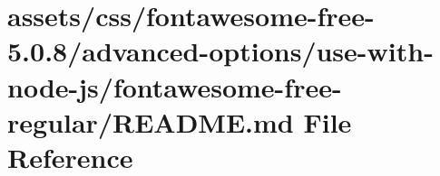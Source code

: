 \hypertarget{css_2fontawesome-free-5_80_88_2advanced-options_2use-with-node-js_2fontawesome-free-regular_2_r_e_a_d_m_e_8md}{}\section{assets/css/fontawesome-\/free-\/5.0.8/advanced-\/options/use-\/with-\/node-\/js/fontawesome-\/free-\/regular/\+R\+E\+A\+D\+ME.md File Reference}
\label{css_2fontawesome-free-5_80_88_2advanced-options_2use-with-node-js_2fontawesome-free-regular_2_r_e_a_d_m_e_8md}
